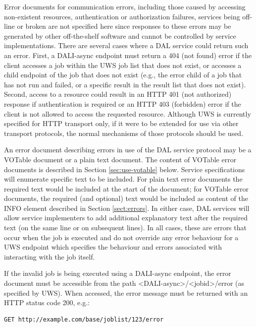 \documentclass[11pt,letter]{ivoa}
\begin{document}
Error documents for communication errors, including those caused by accessing
non-existent resources, authentication or authorization failures, services being
off-line or broken are not specified here since responses to these errors may be
generated by other off-the-shelf software and cannot be controlled by service
implementations. There are several cases where a DAL service could return such
an error. First, a DALI-async endpoint must return a 404 (not found) error if
the client accesses a job within the UWS job list that does not exist, or
accesses a child endpoint of the job that does not exist (e.g., the error
child of a job that has not run and failed, or a specific result in
the result list  that does not exist). Second, access to a resource could result
in an HTTP 401 (not authorized) response if authentication is required or an
HTTP 403 (forbidden) error if the client is not allowed to access the requested
resource. Although UWS is currently specified for HTTP transport only, if it
were to be extended for use via other transport protocols, the normal mechanisms
of those protocols should be used.

An error document describing errors in use of the DAL service protocol may be a
VOTable document \citep{2019ivoa.spec.1021O} or a plain text document.
The content of
VOTable error documents is described in Section \ref{sec:use-votable} below. Service
specifications will enumerate specific text to be included. For plain text error
documents the required text would be included at the start of the document; for
VOTable error documents, the required (and optional) text would be included as
content of the INFO element described in Section \ref{sect:errors}. In either case, DAL
services will allow service implementers to add additional explanatory text
after the required text (on the same line or on subsequent lines). In all cases,
these are errors that occur when the job is executed and do not override any
error behaviour for a UWS endpoint which specifies the behaviour and errors
associated with interacting with the job itself.

If the invalid job is being executed using a DALI-async endpoint, the error
document must be accessible from the path <DALI-async>/<jobid>/error
(as specified by UWS).  When accessed, the error message must be returned with
an HTTP status code 200, e.g.:

\begin{verbatim}
GET http://example.com/base/joblist/123/error
\end{verbatim}
\end{document}
